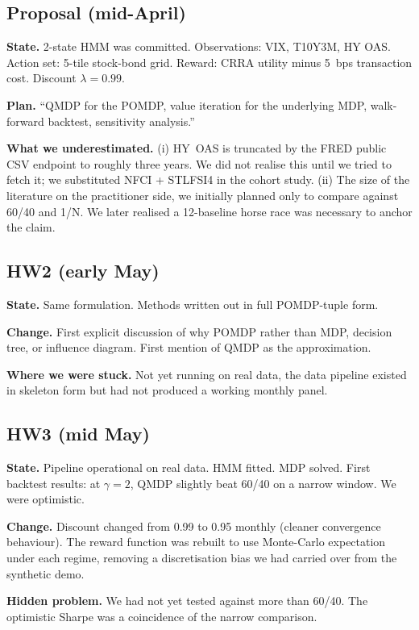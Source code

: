 \documentclass[11pt]{article}
\begin{document}
\subsection{Proposal (mid-April)}

\textbf{State.} 2-state HMM was committed. Observations: VIX, T10Y3M, HY OAS. Action set: 5-tile stock-bond grid. Reward: CRRA utility minus 5~bps transaction cost. Discount $\lambda = 0.99$.

\textbf{Plan.} ``QMDP for the POMDP, value iteration for the underlying MDP, walk-forward backtest, sensitivity analysis.''

\textbf{What we underestimated.} (i) HY~OAS is truncated by the FRED public CSV endpoint to roughly three years. We did not realise this until we tried to fetch it; we substituted NFCI + STLFSI4 in the cohort study. (ii) The size of the literature on the practitioner side, we initially planned only to compare against 60/40 and 1/N. We later realised a 12-baseline horse race was necessary to anchor the claim.

\subsection{HW2 (early May)}

\textbf{State.} Same formulation. Methods written out in full POMDP-tuple form.

\textbf{Change.} First explicit discussion of why POMDP rather than MDP, decision tree, or influence diagram. First mention of QMDP as the approximation.

\textbf{Where we were stuck.} Not yet running on real data, the data pipeline existed in skeleton form but had not produced a working monthly panel.

\subsection{HW3 (mid May)}

\textbf{State.} Pipeline operational on real data. HMM fitted. MDP solved. First backtest results: at $\gamma = 2$, QMDP slightly beat 60/40 on a narrow window. We were optimistic.

\textbf{Change.} Discount changed from 0.99 to 0.95 monthly (cleaner convergence behaviour). The reward function was rebuilt to use Monte-Carlo expectation under each regime, removing a discretisation bias we had carried over from the synthetic demo.

\textbf{Hidden problem.} We had not yet tested against more than 60/40. The optimistic Sharpe was a coincidence of the narrow comparison.
\end{document}
